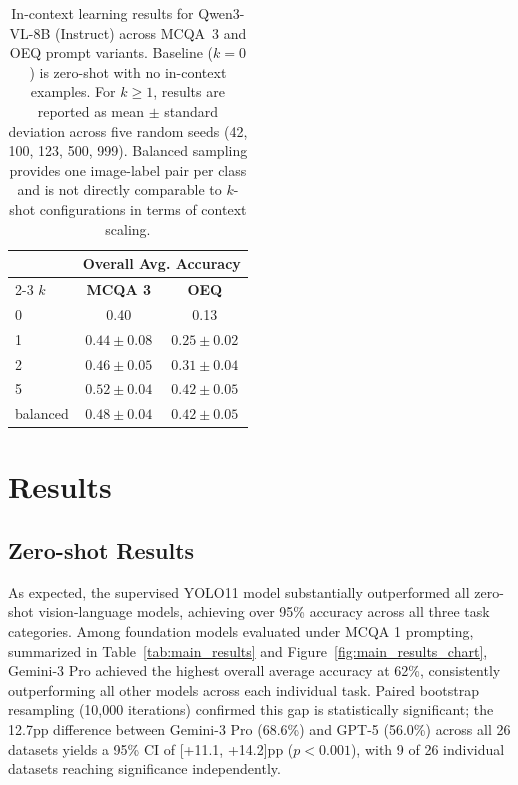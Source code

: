 \documentclass[10pt,letterpaper]{article}
\begin{document}
\begin{table}[t]
\centering
\caption{In-context learning results for Qwen3-VL-8B (Instruct) across MCQA~3 and OEQ prompt variants. Baseline ($k=0$) is zero-shot with no in-context examples. For $k \geq 1$, results are reported as mean $\pm$ standard deviation across five random seeds (42, 100, 123, 500, 999). Balanced sampling provides one image-label pair per class and is not directly comparable to $k$-shot configurations in terms of context scaling.}
\label{tab:icl_results}
\renewcommand{\arraystretch}{1.2}
\footnotesize
\begin{tabular}{lcc}
\toprule
& \multicolumn{2}{c}{\textbf{Overall Avg. Accuracy}} \\
\cmidrule(lr){2-3}
\textbf{$k$} & \textbf{MCQA 3} & \textbf{OEQ} \\
\midrule
0             & 0.40            & 0.13 \\
1             & $0.44 \pm 0.08$ & $0.25 \pm 0.02$ \\
2             & $0.46 \pm 0.05$ & $0.31 \pm 0.04$ \\
5             & $0.52 \pm 0.04$ & $0.42 \pm 0.05$ \\
balanced      & $0.48 \pm 0.04$ & $0.42 \pm 0.05$ \\
\bottomrule
\end{tabular}
\end{table}


\section{Results}
\label{sec:results}

\subsection{Zero-shot Results}
As expected, the supervised YOLO11 model substantially outperformed all zero-shot vision-language models, achieving over 95\% accuracy across all three task categories. Among foundation models evaluated under MCQA 1 prompting, summarized in Table~\ref{tab:main_results} and Figure~\ref{fig:main_results_chart}, Gemini-3 Pro achieved the highest overall average accuracy at 62\%, consistently outperforming all other models across each individual task. Paired bootstrap resampling (10,000 iterations) confirmed this gap is statistically significant; the 12.7pp difference between Gemini-3 Pro (68.6\%) and GPT-5 (56.0\%) across all 26 datasets yields a 95\% CI of [+11.1, +14.2]pp ($p < 0.001$), with 9 of 26 individual datasets reaching significance independently.
\end{document}
